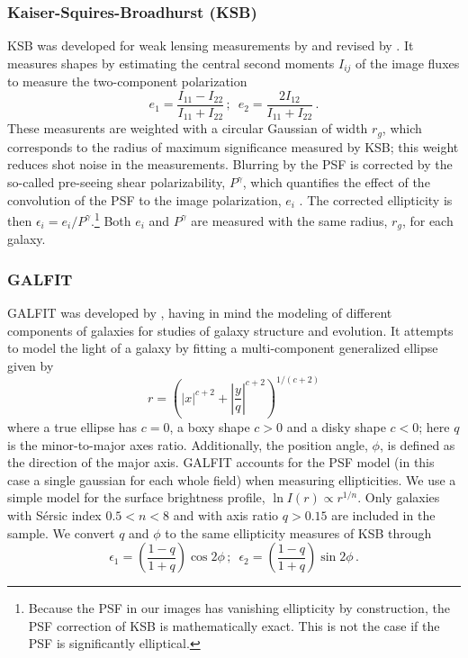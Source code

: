 \subsubsection{Kaiser-Squires-Broadhurst (KSB)}

KSB was developed for weak lensing measurements by \cite{kaiser95} and revised by 
\cite{hoekstra98}. It measures shapes by estimating the central second moments $I_{ij}$ of the 
image 
fluxes to measure the two-component polarization
\begin{equation}
 e_1 = \frac{I_{11}-I_{22}}{I_{11}+I_{22}}\,;\,\,\,e_2 = \frac{2I_{12}}{I_{11}+I_{22}}\,.
\end{equation}
These measurents are weighted with a circular Gaussian of width $r_g$, which corresponds to the 
radius of maximum significance measured by KSB; this weight reduces shot noise in the measurements. 
Blurring by the PSF is corrected by the so-called pre-seeing shear polarizability, $P^\gamma$, 
which quantifies the effect of the convolution of the PSF to the image polarization, $e_i$ 
\citep{luppino97,hoekstra98}. The corrected ellipticity is then 
$\epsilon_i=e_i/P^\gamma$.\footnote{Because the PSF in our images has vanishing ellipticity by 
construction, the PSF correction of KSB is mathematically exact. This is not the case if the PSF is 
significantly elliptical.} Both $e_i$ and $P^\gamma$ are measured with the same radius, $r_g$, for 
each galaxy.

\subsubsection{GALFIT}\label{s:galfit}

GALFIT was developed by \cite{peng02}, having in mind the modeling of different components of 
galaxies for studies of galaxy structure and evolution. It attempts to model the light of a galaxy 
by fitting a multi-component generalized ellipse given by
\begin{equation}
 r = \left(\left\lvert x \right\rvert^{c+2} + 
           \left\lvert \frac{y}{q} \right\rvert^{c+2}\right)^{1/(c+2)}
\end{equation}
where a true ellipse has $c=0$, a boxy shape $c>0$ and a disky shape $c<0$; here $q$ is the 
minor-to-major axes ratio. Additionally, the position angle, $\phi$, is defined as the direction of 
the major axis. GALFIT accounts for the PSF model (in this case a single gaussian for each whole 
field) when measuring ellipticities. We use a simple \cite{sersic68} model for the surface 
brightness profile, $\ln I(r) \propto r^{1/n}$. Only galaxies with S\'ersic index $0.5<n<8$ and 
with axis ratio $q>0.15$ are included in the sample. We convert $q$ and $\phi$ to the same 
ellipticity measures of KSB through
\begin{equation}
 \epsilon_1 = \left(\frac{1-q}{1+q}\right)\cos2\phi \,;\,\,\,
 \epsilon_2 = \left(\frac{1-q}{1+q}\right)\sin2\phi\,.
\end{equation}

